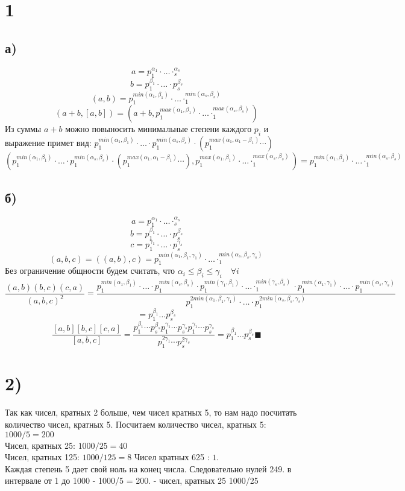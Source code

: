 

	\section*{1}
	\subsection*{а)}
	$$a = p_1^{\alpha_1}\cdot\dots \cdotp_s^{\alpha_s}$$
	$$b = p_1^{\beta_1}\cdot\dots\cdot p_s^{\beta_s}$$
	$$(a,b) = p_1^{min(\alpha_1,\beta_1 ) }\cdot \dots\cdotp_1^{min(\alpha_s,\beta_s ) }$$
	$$(a+b, [a,b]) = (a+b, p_1^{max(\alpha_1,\beta_1 ) }\cdot \dots\cdotp_1^{max(\alpha_s,\beta_s ) })$$
	Из суммы $ a+b $ можно повыносить минимальные степени каждого $p_i$ и выражение примет вид: $p_1^{min(\alpha_1,\beta_1 ) }\cdot \dots\cdot p_1^{min(\alpha_s,\beta_s ) }\cdot (p_1^{max(\alpha_1, \alpha_1-\beta_1)} \cdots)$ \\
	$$(p_1^{min(\alpha_1,\beta_1 ) }\cdot \dots\cdot p_1^{min(\alpha_s,\beta_s ) }\cdot (p_1^{max(\alpha_1, \alpha_1-\beta_1)} \cdots), p_1^{max(\alpha_1,\beta_1 ) }\cdot \dots\cdotp_1^{max(\alpha_s,\beta_s ) }) =p_1^{min(\alpha_1,\beta_1 ) }\cdot \dots\cdotp_1^{min(\alpha_s,\beta_s ) } $$
	\subsection*{б)}
	$$a = p_1^{\alpha_1}\cdot\dots \cdotp_s^{\alpha_s}$$
$$b = p_1^{\beta_1}\cdot\dots\cdot p_s^{\beta_s}$$
$$c = p_1^{\gamma_1}\cdot\dots\cdot p_s^{\gamma_s}$$
$$(a,b,c) = ((a,b),c) = p_1^{min(\alpha_1,\beta_1,\gamma_1 ) }\cdot \dots\cdotp_1^{min(\alpha_s,\beta_s,\gamma_s ) }$$
Без ограничение общности будем считать, что $\alpha_i \leqslant \beta_i \leqslant \gamma_i \quad \forall i$ \\
$$\frac{(a,b) (b,c)(c,a)}{(a,b,c)^2} = \frac{ p_1^{min(\alpha_1,\beta_1 ) }\cdot \dots\cdot p_1^{min(\alpha_s,\beta_s ) }\cdot p_1^{min(\gamma_1,\beta_1 ) }\cdot \dots\cdotp_1^{min(\gamma_s,\beta_s ) }\cdot  p_1^{min(\alpha_1,\gamma_1 ) }\cdot \dots\cdot p_1^{min(\alpha_s,\gamma_s ) }}{p_1^{2min(\alpha_1,\beta_1,\gamma_1 ) }\cdot \dots\cdot p_1^{2min(\alpha_s,\beta_s,\gamma_s ) }}$$ $$= p_1^{\beta_1}\dots p_s^{\beta_s}$$
$$\frac{[a,b][b,c][c,a]}{[a,b,c]} = \frac{p_1^{\beta_1}\cdots p_s^{\beta_s}p_1^{\gamma_1}\cdots p_s^{\gamma_s} p_1^{\gamma_1}\cdots p_s^{\gamma_s} }{p_1^{2\gamma_1}\cdots p_s^{2\gamma_s}}  =  p_1^{\beta_1}\dots p_s^{\beta_s} \blacksquare$$
\section*{2)}
Так как чисел, кратных 2 больше, чем чисел кратных 5, то нам надо посчитать количество чисел, кратных 5. 
Посчитаем количество чисел, кратных 5: $1000/5 = 200$ \\
Чисел, кратных 25: $1000/25 = 40$  \\
Чисел, кратных 125: $1000/125 = 8$
Чисел кратных 625 : $1$. \\
Каждая степень 5 дает свой ноль на конец числа. Следовательно нулей 249. в интервале от 1 до 1000 - 1000/5 = 200. 
- чисел, кратных 25 1000/25 
